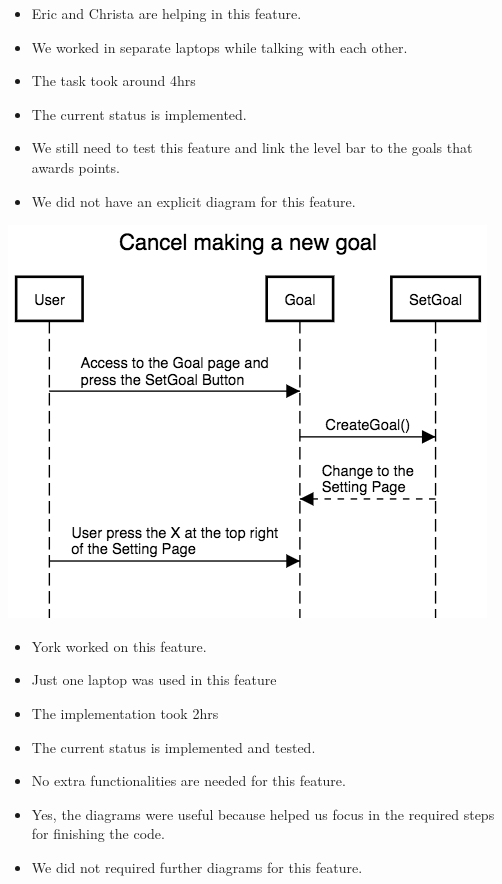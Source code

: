 \documentclass[a4paper]{article}
\begin{document}
\begin{itemize}
	\item Eric and Christa are helping in this feature. 
	\item We worked in separate laptops while talking with each other.
    \item The task took around 4hrs
    \item The current status is implemented.
  \item We still need to test this feature and link the level bar to the goals that awards points.
  \item We did not have an explicit diagram for this feature.
\end{itemize}
\includegraphics[width=\textwidth]{cancel_goal.png}
\begin{itemize}
	\item York worked on this feature. 
	\item Just one laptop was used in this feature
    \item The implementation took 2hrs
    \item The current status is implemented and tested.
  \item No extra functionalities are needed for this feature.
  \item Yes, the diagrams were useful because helped us focus in the required steps for finishing the code.
  \item We did not required further diagrams for this feature.
\end{itemize}
\end{document}
